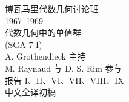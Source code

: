 \begin{titlepage}
\centering
\vspace*{1.8cm}
{\large 博瓦马里代数几何讨论班}\\[0.6em]
{\large 1967--1969}\\[2.2cm]
{\LARGE 代数几何中的单值群}\\[1em]
{\Large (SGA 7 I)}\\[2.4cm]
{\large A. Grothendieck 主持}\\[0.8em]
{\large M. Raynaud 与 D. S. Rim 参与}\\[1.8cm]
{\normalsize 报告 I、II、VI、VII、VIII、IX}\\[0.7em]
{\normalsize 中文全译初稿}
\vfill
\end{titlepage}
